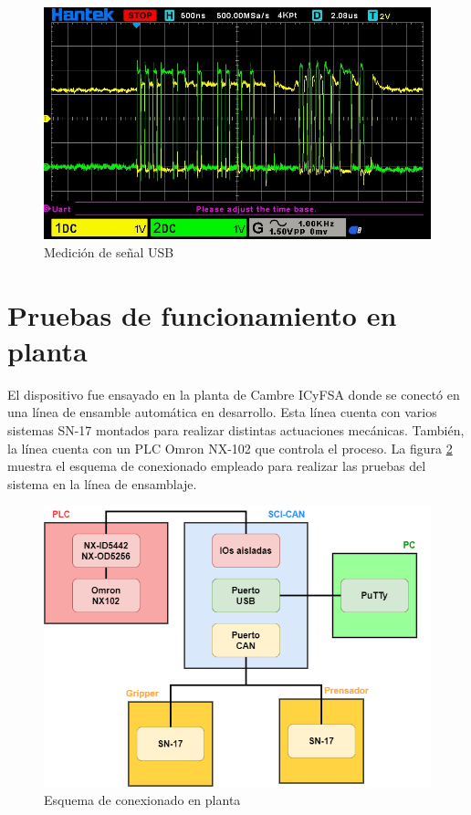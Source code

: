 \begin{figure}[h!]
	\centering
	\includegraphics[scale=0.6]{./Figures/msg_usb.jpeg}
	\caption{Medición de señal USB}
	\label{fig:signal_usb}
\end{figure}

\section{Pruebas de funcionamiento en planta}

El dispositivo fue ensayado en la planta de Cambre ICyFSA donde se conectó en una línea de ensamble automática en desarrollo. Esta línea cuenta con varios sistemas SN-17 montados para realizar distintas actuaciones mecánicas. También, la línea cuenta con un PLC Omron NX-102 que controla el proceso. La figura \ref{fig:esquema_conexion_planta} muestra el esquema de conexionado empleado para realizar las pruebas del sistema en la línea de ensamblaje.

\begin{figure}[h!]
	\centering
	\includegraphics[scale=0.5]{./Figures/esquema_cambre.png}
	\caption{Esquema de conexionado en planta}
	\label{fig:esquema_conexion_planta}
\end{figure}

